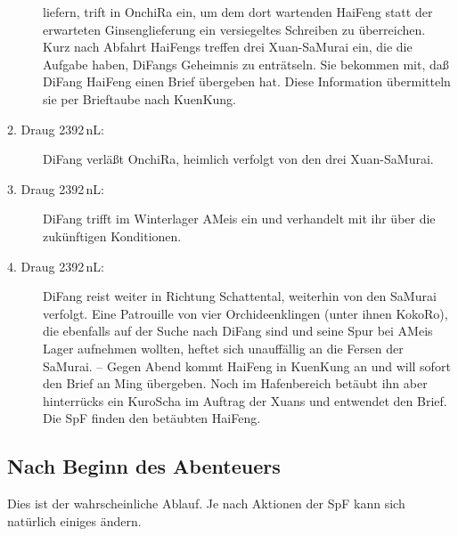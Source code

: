 \documentclass[
a4paper,
twoside,
DIV=calc,
BCOR=4mm,
fontsize=9pt,
twocolumn=on,
titlepage=on,
parskip=half
]{scrartcl}
\begin{document}
\begin{description}
  liefern, trift in OnchiRa ein, um dem dort wartenden HaiFeng statt
  der erwarteten Ginsenglieferung ein versiegeltes Schreiben zu
  überreichen. Kurz nach Abfahrt HaiFengs treffen drei Xuan-SaMurai
  ein, die die Aufgabe haben, DiFangs Geheimnis zu enträtseln. Sie
  bekommen mit, daß DiFang HaiFeng einen Brief übergeben hat. Diese
  Information übermitteln sie per Brieftaube nach KuenKung.
\item[2. Draug 2392\,nL:] DiFang verläßt OnchiRa, heimlich verfolgt
  von den drei Xuan-SaMurai.
\item[3. Draug 2392\,nL:] DiFang trifft im Winterlager AMeis ein und
  verhandelt mit ihr über die zukünftigen Konditionen.
\item[4. Draug 2392\,nL:] DiFang reist weiter in Richtung Schattental,
  weiterhin von den SaMurai verfolgt.  Eine Patrouille von vier
  Orchideenklingen (unter ihnen KokoRo), die ebenfalls auf der Suche
  nach DiFang sind und seine Spur bei AMeis Lager aufnehmen wollten,
  heftet sich unauffällig an die Fersen der SaMurai. -- Gegen Abend
  kommt HaiFeng in KuenKung an und will sofort den Brief an Ming
  übergeben. Noch im Hafenbereich betäubt ihn aber hinterrücks ein
  KuroScha im Auftrag der Xuans und entwendet den Brief. Die SpF
  finden den betäubten HaiFeng.
\end{description}

\subsection{Nach Beginn des Abenteuers}

Dies ist der wahrscheinliche Ablauf. Je nach Aktionen der SpF kann
sich natürlich einiges ändern.
\end{document}
